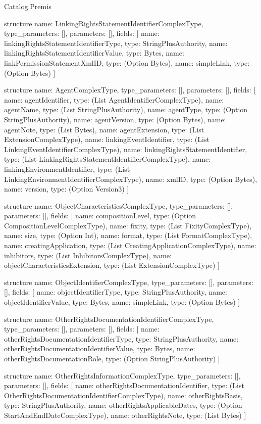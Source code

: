\begin{lexlean}{Catalog.Premis}
\begin{semanticmodule}
structure{
  name: LinkingRightsStatementIdentifierComplexType,
  type_parameters: [],
  parameters: [],
  fields: [
    {name: linkingRightsStatementIdentifierType, type: StringPlusAuthority},
    {name: linkingRightsStatementIdentifierValue, type: Bytes},
    {name: linkPermissionStatementXmlID, type: (Option Bytes)},
    {name: simpleLink, type: (Option Bytes)}
  ]
}

structure{
  name: AgentComplexType,
  type_parameters: [],
  parameters: [],
  fields: [
    {name: agentIdentifier, type: (List AgentIdentifierComplexType)},
    {name: agentName, type: (List StringPlusAuthority)},
    {name: agentType, type: (Option StringPlusAuthority)},
    {name: agentVersion, type: (Option Bytes)},
    {name: agentNote, type: (List Bytes)},
    {name: agentExtension, type: (List ExtensionComplexType)},
    {name: linkingEventIdentifier, type: (List LinkingEventIdentifierComplexType)},
    {name: linkingRightsStatementIdentifier, type: (List LinkingRightsStatementIdentifierComplexType)},
    {name: linkingEnvironmentIdentifier, type: (List LinkingEnvironmentIdentifierComplexType)},
    {name: xmlID, type: (Option Bytes)},
    {name: version, type: (Option Version3)}
  ]
}

structure{
  name: ObjectCharacteristicsComplexType,
  type_parameters: [],
  parameters: [],
  fields: [
    {name: compositionLevel, type: (Option CompositionLevelComplexType)},
    {name: fixity, type: (List FixityComplexType)},
    {name: size, type: (Option Int)},
    {name: format, type: (List FormatComplexType)},
    {name: creatingApplication, type: (List CreatingApplicationComplexType)},
    {name: inhibitors, type: (List InhibitorsComplexType)},
    {name: objectCharacteristicsExtension, type: (List ExtensionComplexType)}
  ]
}

structure{
  name: ObjectIdentifierComplexType,
  type_parameters: [],
  parameters: [],
  fields: [
    {name: objectIdentifierType, type: StringPlusAuthority},
    {name: objectIdentifierValue, type: Bytes},
    {name: simpleLink, type: (Option Bytes)}
  ]
}

structure{
  name: OtherRightsDocumentationIdentifierComplexType,
  type_parameters: [],
  parameters: [],
  fields: [
    {name: otherRightsDocumentationIdentifierType, type: StringPlusAuthority},
    {name: otherRightsDocumentationIdentifierValue, type: Bytes},
    {name: otherRightsDocumentationRole, type: (Option StringPlusAuthority)}
  ]
}

structure{
  name: OtherRightsInformationComplexType,
  type_parameters: [],
  parameters: [],
  fields: [
    {name: otherRightsDocumentationIdentifier, type: (List OtherRightsDocumentationIdentifierComplexType)},
    {name: otherRightsBasis, type: StringPlusAuthority},
    {name: otherRightsApplicableDates, type: (Option StartAndEndDateComplexType)},
    {name: otherRightsNote, type: (List Bytes)}
  ]
}


\end{semanticmodule}
\end{lexlean}
